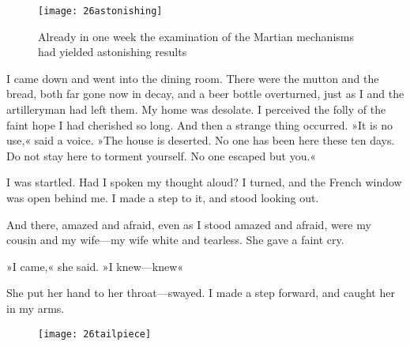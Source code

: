 \begin{figure}[tbp]
\centering
\texttt{[image: 26astonishing]}
\caption[The examination of the Martian mechanisms]{Already in one week the examination of the Martian mechanisms had yielded astonishing results}
\end{figure}

I came down and went into the dining room. There were the mutton and the bread, both far gone now in decay, and a beer bottle overturned, just as I and the artilleryman had left them. My home was desolate. I perceived the folly of the faint hope I had cherished so long. And then a strange thing occurred. »It is no use,« said a voice. »The house is deserted. No one has been here these ten days. Do not stay here to torment yourself. No one escaped but you.«

I was startled. Had I spoken my thought aloud? I turned, and the French window was open behind me. I made a step to it, and stood looking out.

And there, amazed and afraid, even as I stood amazed and afraid, were my cousin and my wife—my wife white and tearless. She gave a faint cry.

»I came,« she said. »I knew—knew\longdash«

She put her hand to her throat—swayed. I made a step forward, and caught her in my arms.

\begin{figure}[b!]
\centering
\texttt{[image: 26tailpiece]}
\end{figure}